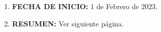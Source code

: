 {\begin{enumerate}
        \item  \textbf{FECHA DE INICIO:} 1 de Febrero de 2023.%
        \item  \textbf{RESUMEN:} Ver siguiente página.

    \end{enumerate}
    \cleardoublepage
}
